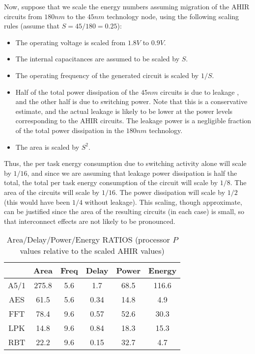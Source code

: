 \documentclass[conference]{IEEEtran}
\begin{document}
Now, suppose
that  we scale the 
energy numbers assuming migration of the AHIR circuits
from $180nm$ to the $45nm$ technology node, using 
the following  scaling rules (assume that $S = 45/180 = 0.25$):
\begin{itemize}
\item The operating voltage is scaled from $1.8V$ to $0.9V$.
\item The internal capacitances are assumed to be scaled by $S$.
\item The operating frequency of the generated circuit is scaled
by $1/S$.
\item Half of the total power dissipation of the $45nm$ circuits
is due to leakage \cite{ref:Frank}, and the other half is due to switching power. 
Note that this is a conservative estimate, and the actual leakage is
likely to be lower at the power levels corresponding to the
AHIR circuits.
%
% 
The leakage power is a negligible fraction of the
total power dissipation in the $180nm$ technology.
\item The area is scaled by $S^2$.
\end{itemize}
Thus, the per task energy consumption due to switching
activity alone will scale by $1/16$, and since
we are assuming that leakage power dissipation is half the total,
the total per task energy consumption of the circuit will 
scale by $1/8$.
The area of the circuits will scale by $1/16$.  
The power dissipation will scale by $1/2$ (this would have been
$1/4$ without leakage).
This scaling, though approximate, can be justified since the 
area of the resulting circuits (in each case) is small, so 
that interconnect effects are not likely to be pronounced.

\begin{table}[htb]
  \centering
  \caption{Area/Delay/Power/Energy RATIOS (processor $P$ values relative to the scaled AHIR values)}
  \label{table:Ratios}
  \renewcommand\arraystretch{1.2}
  \setlength{\tabcolsep}{1ex}
  \begin{tabular}{c|c|c|c|c|c}
    \hline
    & Area & Freq & Delay & Power & Energy \\
    \hline
    \hline
    A5/1 & 275.8 & 5.6 & 1.7 & 68.5 & 116.6  \\
    \hline
    AES & 61.5 & 5.6 & 0.34 & 14.8 & 4.9 \\
    \hline
    FFT & 78.4 & 9.6 & 0.57 & 52.6 & 30.3  \\
    \hline
    LPK & 14.8 & 9.6 & 0.84 & 18.3 & 15.3  \\
    \hline
    RBT & 22.2 & 9.6 & 0.15 & 32.7 & 4.7 \\
    \hline
  \end{tabular}

\end{table}
\end{document}
